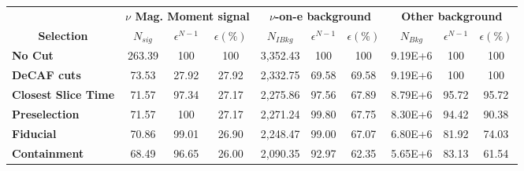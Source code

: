 \documentclass[12pt]{article}
\begin{document}
\begin{table}[!hb]
\begin{tabular}{|l|ccc|ccc|ccc|}\hline
\multicolumn{1}{|c|}{}                                     & \multicolumn{3}{c|}{\textbf{$\nu$ Mag. Moment signal}}          & \multicolumn{3}{c|}{\textbf{$\nu$-on-e background}}                      & \multicolumn{3}{c|}{\textbf{Other background}}                           \\
\multicolumn{1}{|c|}{\multirow{-2}{*}{\textbf{Selection}}} & \multicolumn{1}{c}{\textbf{$N_{sig}$}} & \textbf{$\epsilon^{N-1}$} & \textbf{$\epsilon \left(\%\right)$} & \multicolumn{1}{c}{\textbf{$N_{IBkg}$}} & \textbf{$\epsilon^{N-1}$} & \textbf{$\epsilon \left(\%\right)$} & \multicolumn{1}{c}{\textbf{$N_{Bkg}$}} & \textbf{$\epsilon^{N-1}$} & \textbf{$\epsilon \left(\%\right)$} \\\hline
\textbf{No Cut}                                          & 263.39                                 & 100       & 100       & 3,352.43                                         & 100       & 100       & 9.19E+6                                         & 100       & 100       \\
\textbf{DeCAF cuts}                                      & 73.53                                  & 27.92     & 27.92     & 2,332.75                                         & 69.58     & 69.58     & 9.19E+6 & 100       & 100       \\
\textbf{Closest Slice Time}                              & 71.57                                  & 97.34     & 27.17     & 2,275.86                                         & 97.56     & 67.89     & 8.79E+6                                         & 95.72     & 95.72     \\
\textbf{Preselection}                                    & 71.57                                  & 100       & 27.17     & 2,271.24                                         & 99.80     & 67.75     & 8.30E+6                                         & 94.42     & 90.38     \\
\textbf{Fiducial}                                        & 70.86                                  & 99.01     & 26.90     & 2,248.47                                         & 99.00     & 67.07     & 6.80E+6                                         & 81.92     & 74.03     \\
\textbf{Containment}                                     & 68.49                                  & 96.65     & 26.00     & 2,090.35                                         & 92.97     & 62.35     & 5.65E+6                                         & 83.13     & 61.54     \\

\end{tabular}
\end{table}
\end{document}
